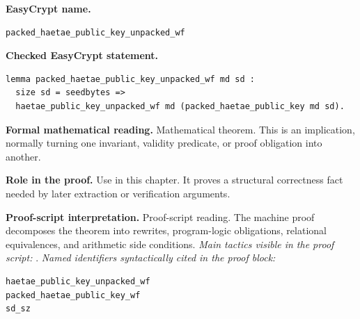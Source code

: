 \begin{formaltheorem}
\noindent\textbf{EasyCrypt name.}
\begin{lstlisting}[language=EasyCrypt,basicstyle=\ttfamily\scriptsize]
packed_haetae_public_key_unpacked_wf
\end{lstlisting}
\noindent\textbf{Checked EasyCrypt statement.}
\begin{lstlisting}[language=EasyCrypt,basicstyle=\ttfamily\scriptsize]
lemma packed_haetae_public_key_unpacked_wf md sd :
  size sd = seedbytes =>
  haetae_public_key_unpacked_wf md (packed_haetae_public_key md sd).
\end{lstlisting}
\noindent\textbf{Formal mathematical reading.}
Mathematical theorem. This is an implication, normally turning one invariant, validity predicate, or proof obligation into another.

\noindent\textbf{Role in the proof.}
Use in this chapter. It proves a structural correctness fact needed by later extraction or verification arguments.

\noindent\textbf{Proof-script interpretation.}
Proof-script reading. The machine proof decomposes the theorem into rewrites, program-logic obligations, relational equivalences, and arithmetic side conditions.
\emph{Main tactics visible in the proof script:} .
\emph{Named identifiers syntactically cited in the proof block:}
\begin{lstlisting}[language=EasyCrypt,basicstyle=\ttfamily\scriptsize]
haetae_public_key_unpacked_wf
packed_haetae_public_key_wf
sd_sz
\end{lstlisting}

\end{formaltheorem}

